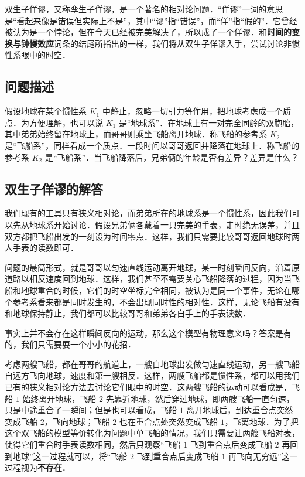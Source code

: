 

双生子佯谬，又称孪生子佯谬，是一个著名的相对论问题．“佯谬”一词的意思是“看起来像是错误但实际上不是”，其中“谬”指“错误”，而“佯”指“假的”．它曾经被认为是一个悖论，但在今天已经被完美解决了，所以成了一个佯谬．和\textbf{时间的变换与钟慢效应}词条的结尾所指出的一样，我们将从双生子佯谬入手，尝试讨论非惯性系眼中的时空．

\subsection{问题描述}

假设地球在某个惯性系 $K_1$ 中静止，忽略一切引力等作用，把地球考虑成一个质点．为方便理解，也可以说 $K_1$ 是“地球系”．在地球上有一对完全同龄的双胞胎，其中弟弟始终留在地球上，而哥哥则乘坐飞船离开地球．称飞船的参考系 $K_2$ 是“飞船系”，同样看成一个质点．一段时间以哥哥返回并降落在地球上．称飞船的参考系 $K_2$ 是“飞船系”．当飞船降落后，兄弟俩的年龄是否有差异？差异是什么？

\subsection{双生子佯谬的解答}

我们现有的工具只有狭义相对论，而弟弟所在的地球系是一个惯性系，因此我们可以先从地球系开始讨论．假设兄弟俩各戴着一只完美的手表，走时绝无误差，并且双方都把飞船出发的一刻设为时间零点．这样，我们只需要比较哥哥返回地球时两人手表的读数即可．

问题的最简形式，就是哥哥以匀速直线运动离开地球，某一时刻瞬间反向，沿着原道路以相反速度回到地球．这样，我们甚至不需要关心飞船降落的过程，因为当飞船和地球重合的时候，它们的时空坐标完全相同，被认为是同一个事件，无论在哪个参考系看来都是同时发生的，不会出现同时性的相对性．这样，无论飞船有没有和地球保持静止，我们都可以比较哥哥和弟弟各自手上的手表读数．

事实上并不会存在这样瞬间反向的运动，那么这个模型有物理意义吗？答案是有的，我们只需要耍一个小小的花招．

考虑两艘飞船，都在哥哥的航道上，一艘自地球出发做匀速直线运动，另一艘飞船自远方飞向地球，速度和第一艘相反．这样，两艘飞船都是惯性系，都可以用我们已有的狭义相对论方法去讨论它们眼中的时空．这两艘飞船的运动可以看成是，飞船 $1$ 始终离开地球，飞船 $2$ 先靠近地球，然后穿过地球，即两艘飞船一直匀速，只是中途重合了一瞬间；但是也可以看成，飞船 $1$ 离开地球后，到达重合点突然变成飞船 $2$，飞向地球；飞船 $2$ 也在重合点处突然变成飞船 $1$，飞离地球．为了把这个双飞船的模型等价转化为问题中单飞船的情况，我们只需要让两艘飞船对表，使得它们重合时手表读数相同，然后只观察“飞船 $1$ 飞到重合点后变成飞船 $2$ 再回到地球”这一过程就可以，将“飞船 $2$ 飞到重合点后变成飞船 $1$ 再飞向无穷远”这一过程视为\textbf{不存在}．

